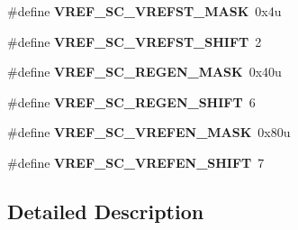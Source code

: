 \begin{DoxyCompactItemize}
\item 
\hypertarget{group___v_r_e_f___register___masks_gadc4f84c737775ee82f350149ade8f5bf}{}\#define {\bfseries V\+R\+E\+F\+\_\+\+S\+C\+\_\+\+V\+R\+E\+F\+S\+T\+\_\+\+M\+A\+S\+K}~0x4u\label{group___v_r_e_f___register___masks_gadc4f84c737775ee82f350149ade8f5bf}

\item 
\hypertarget{group___v_r_e_f___register___masks_ga88b36251362ceabbeeb2302dae65000d}{}\#define {\bfseries V\+R\+E\+F\+\_\+\+S\+C\+\_\+\+V\+R\+E\+F\+S\+T\+\_\+\+S\+H\+I\+F\+T}~2\label{group___v_r_e_f___register___masks_ga88b36251362ceabbeeb2302dae65000d}

\item 
\hypertarget{group___v_r_e_f___register___masks_ga1396c56eb73d89394a57b1f83f20c9ea}{}\#define {\bfseries V\+R\+E\+F\+\_\+\+S\+C\+\_\+\+R\+E\+G\+E\+N\+\_\+\+M\+A\+S\+K}~0x40u\label{group___v_r_e_f___register___masks_ga1396c56eb73d89394a57b1f83f20c9ea}

\item 
\hypertarget{group___v_r_e_f___register___masks_gacfe64ba6f4a76a4aef274f2fedb95a90}{}\#define {\bfseries V\+R\+E\+F\+\_\+\+S\+C\+\_\+\+R\+E\+G\+E\+N\+\_\+\+S\+H\+I\+F\+T}~6\label{group___v_r_e_f___register___masks_gacfe64ba6f4a76a4aef274f2fedb95a90}

\item 
\hypertarget{group___v_r_e_f___register___masks_ga2df8186aa60a77e25e67589bc50ce539}{}\#define {\bfseries V\+R\+E\+F\+\_\+\+S\+C\+\_\+\+V\+R\+E\+F\+E\+N\+\_\+\+M\+A\+S\+K}~0x80u\label{group___v_r_e_f___register___masks_ga2df8186aa60a77e25e67589bc50ce539}

\item 
\hypertarget{group___v_r_e_f___register___masks_gaca5e397ea8b43f55854f4a6b80ec479b}{}\#define {\bfseries V\+R\+E\+F\+\_\+\+S\+C\+\_\+\+V\+R\+E\+F\+E\+N\+\_\+\+S\+H\+I\+F\+T}~7\label{group___v_r_e_f___register___masks_gaca5e397ea8b43f55854f4a6b80ec479b}

\end{DoxyCompactItemize}


\subsection{Detailed Description}

